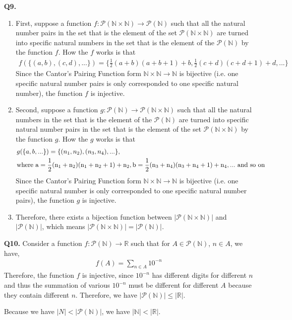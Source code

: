 \documentclass{article}[12pt]
\begin{document}
\noindent \textbf{Q9.}
\begin{enumerate}
\item First, suppose a function $f:\mathcal{P}(\mathbb{N} \times \mathbb{N})\rightarrow\mathcal{P}(\mathbb{N})$ such that all the natural number pairs in the set that is the element of the set $\mathcal{P}(\mathbb{N} \times \mathbb{N})$ are turned into specific natural numbers in the set that is the element of the $\mathcal{P}(\mathbb{N})$ by the function $f$. How the $f$ works is that 
\begin{align*}
f(\{(a,b),(c,d),...\})=\{\frac{1}{2}(a+b)(a+b+1)+b,\frac{1}{2}(c+d)(c+d+1)+d,...\}
\end{align*}
Since the Cantor's Pairing Function form $\mathbb{N}\times \mathbb{N}\rightarrow \mathbb{N}$ is bijective (i.e. one specific natural number pairs is only corresponded to one specific natural number), the function $f$ is injective.
\item Second, suppose a function $g:\mathcal{P}(\mathbb{N})\rightarrow\mathcal{P}(\mathbb{N} \times \mathbb{N})$ such that all the natural numbers in the set that is the element of the $\mathcal{P}(\mathbb{N})$ are turned into specific natural number pairs in the set that is the element of the set $\mathcal{P}(\mathbb{N} \times \mathbb{N})$ by the function $g$. How the $g$ works is that 
\begin{align*}
&g(\{a,b,...\})=\{(n_1,n_2),(n_3,n_4),...\},\\
& \rm{where}\ a=\frac{1}{2}(n_1+n_2)(n_1+n_2+1)+n_2, b=\frac{1}{2}(n_3+n_4)(n_3+n_4+1)+n_4,...\ \rm{and\ so\ on}
\end{align*}
Since the Cantor's Pairing Function form $\mathbb{N}\times \mathbb{N}\rightarrow \mathbb{N}$ is bijective (i.e. one specific natural number is only corresponded to one specific natural number pairs), the function $g$ is injective.
\item Therefore, there exists a bijection function between $|\mathcal{P}(\mathbb{N} \times \mathbb{N})|$ and $|\mathcal{P}(\mathbb{N})|$, which means $|\mathcal{P}(\mathbb{N} \times \mathbb{N})|=|\mathcal{P}(\mathbb{N})|$.
\end{enumerate}



\noindent \textbf{Q10.}
Consider a function $f:\mathcal{P}(\mathbb{N})\rightarrow \mathbb{R}$ such that for $A\in \mathcal{P}(\mathbb{N})$, $n\in A$, we have,
\begin{align*}
f(A)=\sum_{n\in A}10^{-n}
\end{align*}
Therefore, the function $f$ is injective, since $10^{-n}$ has different digits for different $n$ and thus the summation of various $10^{-n}$ must be different for different $A$ because they contain different $n$. Therefore, we have $| \mathcal{P}(\mathbb{N})|\leq |\mathbb{R}|$. 
\par Because we have $|N|<|\mathcal{P}(\mathbb{N})|$, we have $|\mathbb{N}|<|\mathbb{R}|$.









\end{document}
